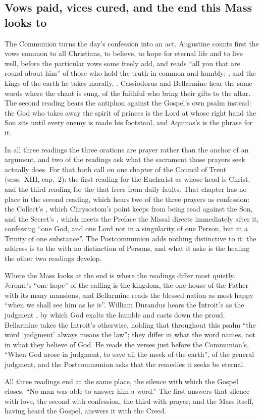\subsection{Vows paid, vices cured, and the end this Mass looks to}

The Communion turns the day's confession into an act. Augustine counts first
the vows common to all Christians, to believe, to hope for eternal life and to
live well, before the particular vows some freely add, and reads ``all you that
are round about him'' of those who hold the truth in common and humbly;
, and the kings of the
earth he takes morally, . Cassiodorus
and Bellarmine hear the same words where the chant is sung, of the faithful who
bring their gifts to the altar. The second reading hears the antiphon
against the Gospel's own psalm instead: the God who takes away the spirit of
princes is the Lord at whose right hand the Son sits until every enemy is made
his footstool, and Aquinas's  is the phrase for
it.

In all three readings the three orations are prayer rather than the anchor of
an argument, and two of the readings ask what the sacrament
those prayers seek actually does. For that both call on one chapter of the
Council of Trent (sess.~XIII, cap.~2): the first reading for the
Eucharist as  whose head is Christ, and
the third reading for the  that frees from
daily faults. That chapter has no place in the second reading,
which hears two of the three prayers as confession: the Collect's , which Chrysostom's point
keeps from being read against the Son, and the Secret's , which
meets the Preface the Missal directs immediately after it, confessing ``one
God, and one Lord not in a singularity of one Person, but in a Trinity of one
substance''. The Postcommunion adds nothing distinctive to it: the address is
to the  with no
distinction of Persons, and what it asks is the healing the other two readings
develop.

Where the Mass looks at the end is where the readings differ most quietly.
Jerome's ``one hope'' of the calling is the kingdom, the one house of the
Father with its many mansions, and Bellarmine reads the blessed nation as most happy
``when we shall see him as he is''. William Durandus hears the Introit's
 as the judgment , by which God exalts the humble and casts down the proud.
Bellarmine takes the Introit's  otherwise, holding
that throughout this psalm ``the word `judgment' always means the law''; they
differ in what the word names, not in what they believe of God. He reads the
verses just before the Communion's, ``When God arose in judgment, to save all
the meek of the earth'', of the general
judgment, and the Postcommunion asks that the remedies it seeks be eternal.

All three readings end at the same place, the silence with which the Gospel
closes. ``No man was able to answer him a word.'' The first answers that
silence with love, the second with confession, the third with prayer; and the
Mass itself, having heard the Gospel, answers it with the Creed.
